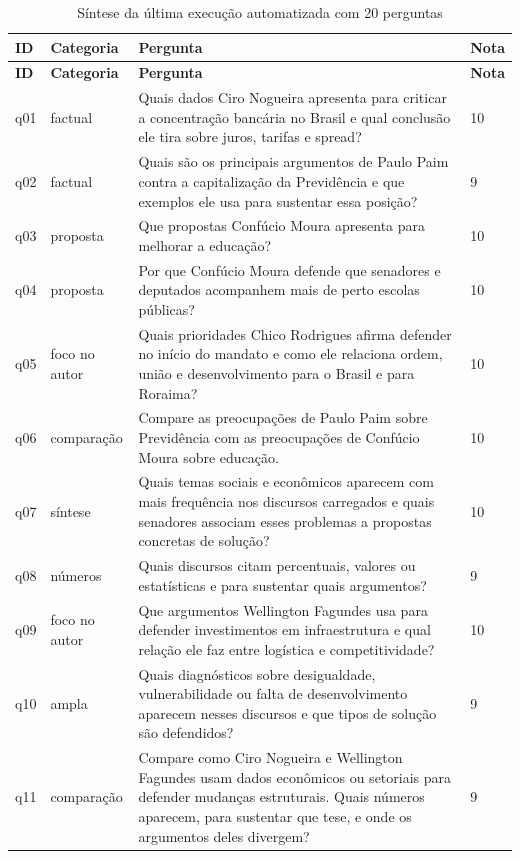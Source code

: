 \begingroup
\footnotesize
\setlength{\LTpre}{0pt}
\setlength{\LTpost}{0pt}
\begin{longtable}{@{}p{}p{}p{}p{}@{}}
\caption{Síntese da última execução automatizada com 20 perguntas}\label{tab:resultado-final-20}\\
\textbf{ID} & \textbf{Categoria} & \textbf{Pergunta} & \textbf{Nota} \\
\hline
\endfirsthead
\textbf{ID} & \textbf{Categoria} & \textbf{Pergunta} & \textbf{Nota} \\
\hline
\endhead
q01 & factual & Quais dados Ciro Nogueira apresenta para criticar a concentração bancária no Brasil e qual conclusão ele tira sobre juros, tarifas e spread? & 10 \\
q02 & factual & Quais são os principais argumentos de Paulo Paim contra a capitalização da Previdência e que exemplos ele usa para sustentar essa posição? & 9 \\
q03 & proposta & Que propostas Confúcio Moura apresenta para melhorar a educação? & 10 \\
q04 & proposta & Por que Confúcio Moura defende que senadores e deputados acompanhem mais de perto escolas públicas? & 10 \\
q05 & foco no autor & Quais prioridades Chico Rodrigues afirma defender no início do mandato e como ele relaciona ordem, união e desenvolvimento para o Brasil e para Roraima? & 10 \\
q06 & comparação & Compare as preocupações de Paulo Paim sobre Previdência com as preocupações de Confúcio Moura sobre educação. & 10 \\
q07 & síntese & Quais temas sociais e econômicos aparecem com mais frequência nos discursos carregados e quais senadores associam esses problemas a propostas concretas de solução? & 10 \\
q08 & números & Quais discursos citam percentuais, valores ou estatísticas e para sustentar quais argumentos? & 9 \\
q09 & foco no autor & Que argumentos Wellington Fagundes usa para defender investimentos em infraestrutura e qual relação ele faz entre logística e competitividade? & 10 \\
q10 & ampla & Quais diagnósticos sobre desigualdade, vulnerabilidade ou falta de desenvolvimento aparecem nesses discursos e que tipos de solução são defendidos? & 9 \\
q11 & comparação & Compare como Ciro Nogueira e Wellington Fagundes usam dados econômicos ou setoriais para defender mudanças estruturais. Quais números aparecem, para sustentar que tese, e onde os argumentos deles divergem? & 9 \\

\end{longtable}
